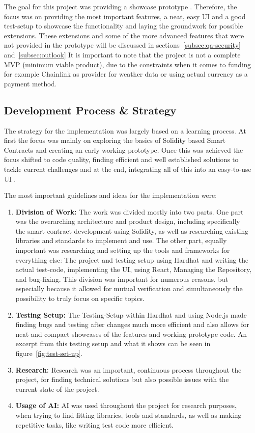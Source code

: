 \documentclass[11pt,a4paper]{article}
\begin{document}
	The goal for this project was providing a showcase prototype .
	Therefore, the focus was on providing the most important features, a neat, easy UI and a good test-setup to showcase the functionality and laying the groundwork for possible extensions.
	These extensions and some of the more advanced features that were not provided in the prototype will be discussed in sections~\ref{subsec:qa-security} and~\ref{subsec:outlook}
	It is important to note that the project is not a complete MVP (minimum viable product), due to the constraints when it comes to funding for example Chainlink as provider for weather data or using actual currency as a payment method.


	\subsection{Development Process \& Strategy}\label{subsec:dev-strategy}
	The strategy for the implementation was largely based on a learning process.
	At first the focus was mainly on exploring the basics of Solidity based Smart Contracts and creating an early working prototype.
	Once this was achieved the focus shifted to code quality, finding efficient and well established solutions to tackle current challenges and at the end, integrating all of this into an easy-to-use UI .


	The most important guidelines and ideas for the implementation were:

	\begin{enumerate}[1]
		\item \textbf{Division of Work:} The work was divided mostly into two parts.
			One part was the overarching architecture and product design, including specifically the smart contract development using Solidity, as well as researching existing libraries and standards to implement and use.
			The other part, equally important was researching and setting up the tools and frameworks for everything else: The project and testing setup using Hardhat and writing the actual test-code, implementing the UI, using React, Managing the Repository, and bug-fixing.
			This division was important for numerous reasons, but especially because it allowed for mutual verification and simultaneously the possibility to truly focus on specific topics.
		\item \textbf{Testing Setup:} The Testing-Setup within Hardhat and using Node.js made finding bugs and testing after changes much more efficient and also allows for neat and compact showcases of the features and working prototype code.
			An excerpt from this testing setup and what it shows can be seen in figure~\ref{fig:test-set-up}.
		\item \textbf{Research:} Research was an important, continuous process throughout the project, for finding technical solutions but also possible issues with the current state of the project.
		\item \textbf{Usage of AI:} AI was used throughout the project for research purposes, when trying to find fitting libraries, tools and standards, as well as making repetitive tasks, like writing test code more efficient.
	\end{enumerate}
\end{document}
